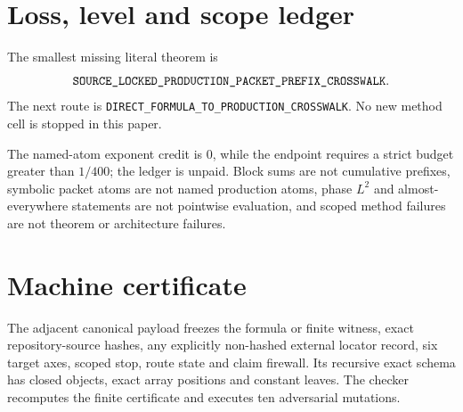 \documentclass[11pt]{article}
\begin{document}
\section{Loss, level and scope ledger}
The smallest missing literal theorem is
\[
\texttt{SOURCE\_\allowbreak{}LOCKED\_\allowbreak{}PRODUCTION\_\allowbreak{}PACKET\_\allowbreak{}PREFIX\_\allowbreak{}CROSSWALK}.
\]
The next route is \texttt{DIRECT\_\allowbreak{}FORMULA\_\allowbreak{}TO\_\allowbreak{}PRODUCTION\_\allowbreak{}CROSSWALK}.
No new method cell is stopped in this paper.

The named-atom exponent credit is \(0\), while the endpoint requires a
strict budget greater than \(1/400\); the ledger is unpaid.  Block sums are
not cumulative prefixes, symbolic packet atoms are not named production
atoms, phase \(L^2\) and almost-everywhere statements are not pointwise
evaluation, and scoped method failures are not theorem or architecture
failures.

\section{Machine certificate}
The adjacent canonical payload freezes the formula or finite witness,
exact repository-source hashes, any explicitly non-hashed external locator
record, six target axes, scoped stop, route state and claim firewall.  Its
recursive exact schema has closed objects, exact array positions and
constant leaves.  The checker recomputes the finite certificate and executes
ten adversarial mutations.



\end{document}
